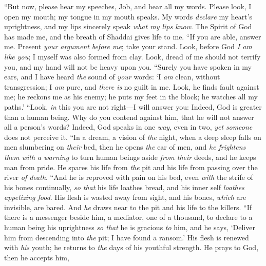 \begin{biblechapter} %
 “But now, please hear my speeches, Job, 
and hear all my words.
\verse Please look, I open my mouth; 
my tongue in my mouth speaks.
\verse My words \textit{declare} my heart’s uprightness, 
and my lips sincerely speak \textit{what my lips know}.
\verse The Spirit of God has made me, 
and the breath of Shaddai gives life to me.
\verse “If you are able, answer me. 
Present \textit{your argument} \textit{before me}; take your stand.
\verse Look, before God \textit{I am like you}; 
I myself was also formed from clay.
\verse Look, dread of me should not terrify you, 
and my hand will not be heavy upon you.
\verse “Surely you have spoken in my ears, 
and I have heard \textit{the} sound of \textit{your} words:
\verse ‘I \textit{am} clean, without transgression; 
I \textit{am} pure, and \textit{there is} no guilt in me.
\verse Look, he finds fault against me; 
he reckons me as his enemy;
\verse he puts my feet in the block; 
he watches all my paths.’
\verse “Look, \textit{in} this you are not right—I will answer you: 
Indeed, God is greater than a human being.
\verse Why do you contend against him, 
that he will not answer all a person’s words?
\verse Indeed, God speaks in one \textit{way}, 
even in two, \textit{yet} \textit{someone} does not perceive it.
\verse “In a dream, a vision of \textit{the} night, 
when a deep sleep falls on men slumbering on \textit{their} bed,
\verse then he opens \textit{the} ear of men, 
and \textit{he frightens them with a warning}
\verse to turn human beings aside \textit{from their} deeds, 
and he keeps man from pride.
\verse He spares his life from \textit{the} pit 
and his life from passing over the river \textit{of death}.
\verse “And he is reproved with pain on his bed, 
even \textit{with} the strife of his bones continually,
\verse \textit{so that} his life loathes bread, 
and his inner self \textit{loathes} \textit{appetizing food}.
\verse His flesh is wasted away from sight, 
and his bones, \textit{which} are invisible, are bared.
\verse And \textit{he} draws near to the pit 
and his life to the killers.
\verse “If there is a messenger beside him, a mediator, one of a thousand, 
to declare to a human being his uprightness
\verse \textit{so that} he is gracious \textit{to} him, and he says, 
‘Deliver him from descending into \textit{the} pit; 
I have found a ransom.’
\verse His flesh is renewed with \textit{his} youth; 
he returns to \textit{the} days of his youthful strength.
\verse He prays to God, then he accepts him, 

\end{biblechapter}
